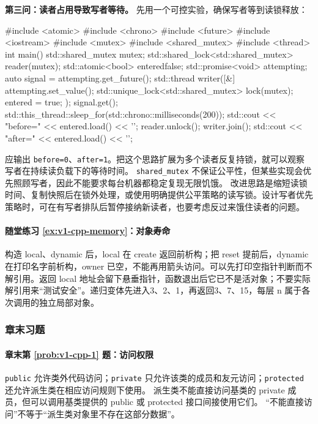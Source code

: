 \begin{solution}
\textbf{第三问：读者占用导致写者等待。} 先用一个可控实验，确保写者等到读锁释放：
\begin{tcpp}
#include <atomic>
#include <chrono>
#include <future>
#include <iostream>
#include <mutex>
#include <shared_mutex>
#include <thread>
int main() {
    std::shared_mutex mutex;
    std::shared_lock<std::shared_mutex> reader(mutex);
    std::atomic<bool> entered{false};
    std::promise<void> attempting;
    auto signal = attempting.get_future();
    std::thread writer([&] {
        attempting.set_value();
        std::unique_lock<std::shared_mutex> lock(mutex);
        entered = true;
    });
    signal.get();
    std::this_thread::sleep_for(std::chrono::milliseconds(200));
    std::cout << "before=" << entered.load() << '\n';
    reader.unlock();
    writer.join();
    std::cout << "after=" << entered.load() << '\n';
}
\end{tcpp}
应输出 \texttt{before=0}、\texttt{after=1}。把这个思路扩展为多个读者反复持锁，就可以观察写者在持续读负载下的等待时间。
\texttt{shared\_mutex} 不保证公平性，但某些实现会优先照顾写者，因此不能要求每台机器都稳定复现无限饥饿。
改进思路是缩短读锁时间、复制快照后在锁外处理，或使用明确提供公平策略的读写锁。设计写者优先策略时，可在有写者排队后暂停接纳新读者，也要考虑反过来饿住读者的问题。
\end{solution}


\paragraph*{随堂练习 \ref{ex:v1-cpp-memory}：对象寿命}
\begin{solution}
构造 local、dynamic 后，local 在 create 返回前析构；把 reset 提前后，dynamic 在打印名字前析构，owner 已空，不能再用箭头访问。可以先打印空指针判断而不解引用。返回 local 地址会留下悬垂指针，函数退出后它已不是活对象；不要实际解引用来“测试安全”。递归变体先进入3、2、1，再返回3、7、15，每层 n 属于各次调用的独立局部对象。
\end{solution}
\subsubsection*{章末习题}

\paragraph*{章末第 \ref{prob:v1-cpp-1} 题：访问权限}
\begin{solution}
\texttt{public} 允许类外代码访问；\texttt{private} 只允许该类的成员和友元访问；\texttt{protected} 还允许派生类在相应访问规则下使用。
派生类不能直接访问基类的 private 成员，但可以调用基类提供的 public 或 protected 接口间接使用它们。
“不能直接访问”不等于“派生类对象里不存在这部分数据”。
\end{solution}

